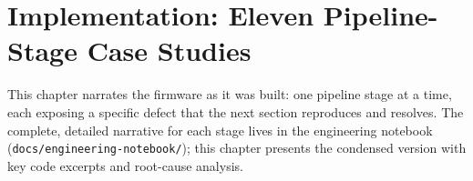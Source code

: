 \chapter{Implementation: Eleven Pipeline-Stage Case Studies}
\label{ch:implementation}

This chapter narrates the firmware as it was built: one pipeline stage at a time, each exposing a specific defect that the next section reproduces and resolves. The complete, detailed narrative for each stage lives in the engineering notebook (\texttt{docs/engineering-notebook/}); this chapter presents the condensed version with key code excerpts and root-cause analysis.




